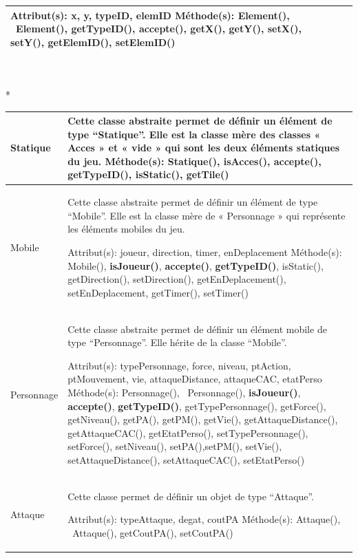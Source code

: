 \documentclass[11pt, a4paper]{article}
\begin{document}
\begin{tabularx}{\textwidth}{ |l|X| }
Attribut(s): x, y, typeID, elemID
\newline
Méthode(s): Element(), ~Element(), \textbf{getTypeID()}, \textbf{accepte()}, getX(), getY(), setX(), setY(), getElemID(), setElemID()
 \\
\hline

\end{tabularx}\\ \\*

\begin{tabularx}{\textwidth}{ |l|X| }
\hline
   Statique & Cette classe abstraite permet de définir un élément de type “Statique”. Elle est la classe mère des classes « Acces » et « vide » qui sont les deux éléments statiques du jeu.
\newline
Méthode(s): Statique(), \textbf{isAcces()}, \textbf{accepte()}, \textbf{getTypeID()}, isStatic(), getTile()
 \\
\hline

   Mobile & Cette classe abstraite permet de définir un élément de type “Mobile”. Elle est la classe mère de « Personnage » qui représente les éléments mobiles du jeu.

Attribut(s): joueur, direction, timer, enDeplacement
\newline
Méthode(s): Mobile(), \textbf{isJoueur()}, \textbf{accepte()}, \textbf{getTypeID()}, isStatic(), getDirection(), setDirection(), getEnDeplacement(), setEnDeplacement, getTimer(), setTimer()
 \\
\hline

   Personnage & Cette classe abstraite permet de définir un élément mobile de type “Personnage”. Elle hérite de la classe “Mobile”.

Attribut(s): typePersonnage, force, niveau, ptAction, ptMouvement, vie, attaqueDistance, attaqueCAC, etatPerso
\newline
Méthode(s): Personnage(), ~Personnage(), \textbf{isJoueur()},\textbf{ accepte()}, \textbf{getTypeID()}, getTypePersonnage(), getForce(), getNiveau(), getPA(), getPM(), getVie(), getAttaqueDistance(), getAttaqueCAC(), getEtatPerso(), setTypePersonnage(), setForce(), setNiveau(), setPA(),setPM(), setVie(), setAttaqueDistance(), setAttaqueCAC(), setEtatPerso()
 \\
\hline

   Attaque & Cette classe permet de définir un objet de type “Attaque”.

Attribut(s): typeAttaque, degat, coutPA
\newline
Méthode(s): Attaque(), ~Attaque(), getCoutPA(), setCoutPA()
 \\
\hline


\end{tabularx}
\end{document}
